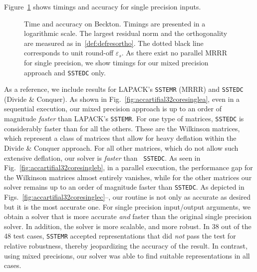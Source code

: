 \documentclass[final]{siamltex}
\begin{document}
Figure~\ref{fig:accartifial32coresingle} shows
timings and accuracy for single precision inputs. 
\begin{figure}[bth]
   \centering   
    

    

   \caption{
     Time and accuracy on {\sc Beckton}. Timings are presented in a
     logarithmic scale. The largest residual norm and the orthogonality are
     measured as in~\eqref{def:defresortho}. The dotted black line
     corresponds to unit round-off $\varepsilon_s$. As there exist no parallel MRRR for
     single precision, we show timings for our mixed precision approach and
     {\tt SSTEDC} only. 
   }
   \label{fig:accartifial32coresingle}
\end{figure}
As a reference, we include
results for LAPACK's {\tt SSTEMR} (MRRR) and {\tt SSTEDC} (Divide \& Conquer). 
As shown in Fig.~\ref{fig:accartifial32coresinglea}, even in a sequential execution, our mixed precision approach is up to an
order of magnitude {\it faster} than LAPACK's {\tt SSTEMR}. For one type of
matrices, {\tt SSTEDC} 
is considerably faster than for all 
the others. These are the Wilkinson matrices, which represent a class of
matrices that allow for heavy deflation within the Divide \& Conquer
approach. For all other matrices, which do 
not allow such extensive deflation, our solver is {\it faster} than {\tt
  SSTEDC}. As seen in Fig.~\ref{fig:accartifial32coresingleb}, in a
parallel execution, the performance gap for the Wilkinson matrices almost
entirely vanishes, while for the other matrices our solver remains up to an order of magnitude
faster than {\tt SSTEDC}.  
As depicted in Figs.~\ref{fig:accartifial32coresinglec}--,
our routine is not only as accurate as
desired but it is the most accurate one. For single precision input/output
arguments, we obtain a solver that is more accurate {\it and} faster than the
original single precision solver. In addition,
the solver is more scalable, and more robust. In 38 out of the 48 test cases,
{\tt SSTEMR} accepted representations that did {\em not} pass the test for
relative robustness, thereby jeopardizing the accuracy of the
result. In contrast, using mixed precisions, our solver was able to find
suitable representations in all cases.
\end{document}
